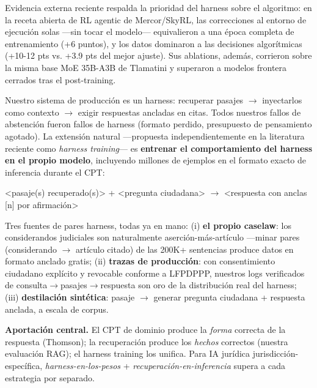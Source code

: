 Evidencia externa reciente respalda la prioridad del harness sobre el algoritmo: en la receta abierta de RL agentic de Mercor/SkyRL, las correcciones al entorno de ejecución solas ---sin tocar el modelo--- equivalieron a una época completa de entrenamiento (+6 puntos), y los datos dominaron a las decisiones algorítmicas (+10-12 pts vs. +3.9 pts del mejor ajuste).\cite{mercor2026} Sus ablations, además, corrieron sobre la misma base MoE 35B-A3B de Tlamatini y superaron a modelos frontera cerrados tras el post-training.\label{sec:harness}

Nuestro sistema de producción es un harness: recuperar pasajes $\rightarrow$ inyectarlos como contexto $\rightarrow$ exigir respuestas ancladas en citas. Todos nuestros fallos de abstención fueron fallos de harness (formato perdido, presupuesto de pensamiento agotado). La extensión natural ---propuesta independientemente en la literatura reciente como \emph{harness training}--- es \textbf{entrenar el comportamiento del harness en el propio modelo}, incluyendo millones de ejemplos en el formato exacto de inferencia durante el CPT:

\begin{center}
\ttfamily\small
<pasaje(s) recuperado(s)> + <pregunta ciudadana> $\rightarrow$ <respuesta con anclas [n] por afirmación>
\end{center}

Tres fuentes de pares harness, todas ya en mano: (i) \textbf{el propio caselaw}: los considerandos judiciales son naturalmente aserción-más-artículo ---minar pares (considerando $\rightarrow$ artículo citado) de las 200K+ sentencias produce datos en formato anclado gratis; (ii) \textbf{trazas de producción}: con consentimiento ciudadano explícito y revocable conforme a LFPDPPP, nuestros logs verificados de consulta$\rightarrow$pasajes$\rightarrow$respuesta son oro de la distribución real del harness; (iii) \textbf{destilación sintética}: pasaje $\rightarrow$ generar pregunta ciudadana + respuesta anclada, a escala de corpus.

\begin{tesis}
\textbf{Aportación central.} El CPT de dominio produce la \emph{forma} correcta de la respuesta (Thomson); la recuperación produce los \emph{hechos} correctos (nuestra evaluación RAG); el harness training los unifica. Para IA jurídica jurisdicción-específica, \emph{harness-en-los-pesos} + \emph{recuperación-en-inferencia} supera a cada estrategia por separado.
\end{tesis}

